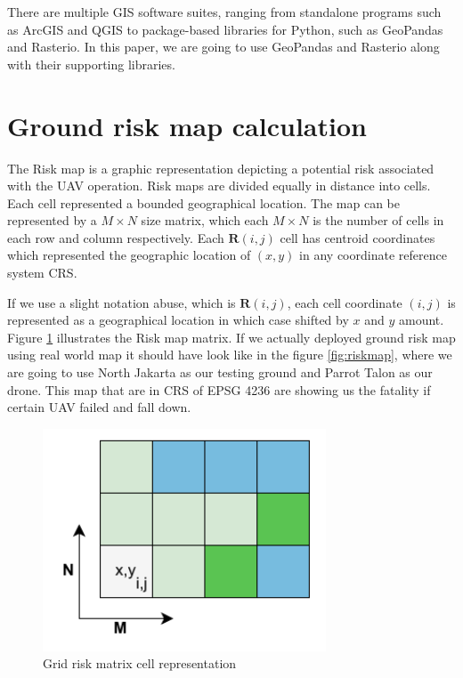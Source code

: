 \documentclass[12pt]{report}
\begin{document}
            There are multiple GIS software suites, ranging from standalone programs such as ArcGIS and QGIS to
            package-based libraries for Python, such as GeoPandas and Rasterio. In this paper, we are going to use
            GeoPandas and Rasterio along with their supporting libraries.

    \section{Ground risk map calculation}
        The Risk map is a graphic representation depicting a potential risk associated with the UAV operation. Risk maps
        are divided equally in distance into cells. Each cell represented a bounded geographical location. The map can
        be represented by a \(M \times N\) size matrix, which each \(M \times N\) is the number of cells in each row and
        column respectively. Each \(\mathbf{R}(i,j)\) cell has centroid coordinates which represented the geographic
        location of \((x, y)\) in any coordinate reference system \ac{CRS}.

        If we use a slight notation abuse, which is \(\mathbf{R}(i,j)\), each cell coordinate \((i, j)\) is represented
        as a geographical location in which case shifted by \(x\) and \(y\) amount. Figure \ref{fig:riskmatrix}
        illustrates the Risk map matrix. If we actually deployed ground risk map using real world map it should have
        look like in the figure \ref{fig:riskmap}, where we are going to use North Jakarta as our testing ground and
        Parrot Talon as our drone. This map that are in \ac{CRS} of \ac{EPSG} 4236 are showing us the fatality if
        certain UAV failed and fall down.

        \begin{figure}[H]
            \centering
            \includegraphics[width=0.75\textwidth]{General Image/OSM Drone-RISK.pdf}
            \caption{Grid risk matrix cell representation}
            \label{fig:riskmatrix}
        \end{figure}
\end{document}
